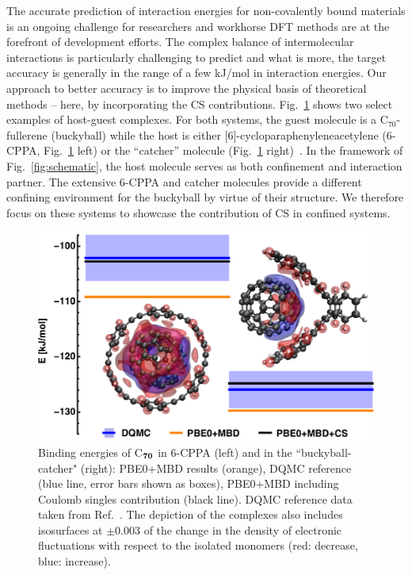 \documentclass[aps,prl,groupaddress, twocolumn]{revtex4-1}
\begin{document}
The accurate prediction of interaction energies for non-covalently bound materials is an ongoing challenge for researchers and workhorse DFT methods are at the forefront of development efforts. The complex balance of intermolecular interactions is particularly challenging to predict and what is more, the target accuracy is generally in the range of a few kJ/mol in interaction energies. Our approach to better accuracy is to improve the physical basis of theoretical methods -- here, by incorporating the CS contributions. 
Fig.~\ref{fig:flagshipsystems} shows two select examples of host-guest complexes. For both systems, the guest molecule is a C$_{70}$-fullerene (buckyball) while the host is either [6]-cycloparaphenyleneacetylene (6-CPPA, Fig.~\ref{fig:flagshipsystems} left) or the ``catcher'' molecule (Fig.~\ref{fig:flagshipsystems} right)~\cite{s12l_2013}. In the framework of Fig.~\ref{fig:schematic}, the host molecule serves as both confinement and interaction partner. The extensive 6-CPPA and catcher molecules provide a different confining environment for the buckyball by virtue of their structure. We therefore focus on these systems to showcase the contribution of CS in confined systems. 
\begin{figure}[htp!]
\centering
\includegraphics[scale=0.68]{Plots/S12L4b.eps}
\caption{Binding energies of C$_{\bf 70}$ in 6-CPPA (left) and in the ``buckyball-catcher" (right):
PBE0+MBD results (orange), DQMC reference (blue line, error bars shown as boxes), PBE0+MBD including Coulomb singles contribution (black line).
DQMC reference data taken from Ref.~\cite{hermann_ncomm2017}.
The depiction of the complexes also includes isosurfaces at $\pm$0.003 of the change in the density of electronic fluctuations with respect to the isolated monomers (red: decrease, blue: increase).}
\label{fig:flagshipsystems}
\end{figure}
\end{document}
